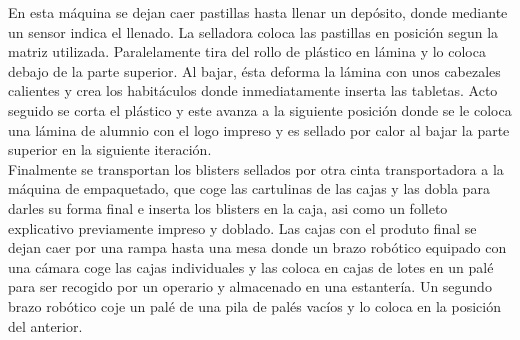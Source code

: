 En esta máquina se dejan caer pastillas hasta llenar un depósito, donde mediante un sensor indica el llenado. La selladora coloca las pastillas en posición segun la matriz utilizada. Paralelamente tira del rollo de plástico en lámina y lo coloca debajo de la parte superior. Al bajar, ésta deforma la lámina con unos cabezales calientes y crea los habitáculos donde inmediatamente inserta las tabletas. Acto seguido se corta el plástico y este avanza a la siguiente posición donde se le coloca una lámina de alumnio con el logo impreso y es sellado por calor al bajar la parte superior en la siguiente iteración. 
\\

Finalmente se transportan los blisters sellados por otra cinta transportadora a la máquina de empaquetado, que coge las cartulinas de las cajas y las dobla para darles su forma final e inserta los blisters en la caja, asi como un folleto explicativo previamente impreso y doblado. Las cajas con el produto final se dejan caer por una rampa hasta una mesa donde un brazo robótico equipado con una cámara coge las cajas individuales y las coloca en cajas de lotes en un palé para ser recogido por un operario y almacenado en una estantería. Un segundo brazo robótico coje un palé de una pila de palés vacíos y lo coloca en la posición del anterior.
\\
